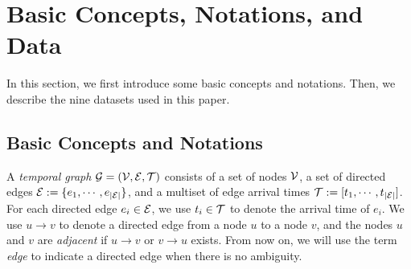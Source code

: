 \section{Basic Concepts, Notations, and Data}\label{section:prelim}

In this section, we first introduce some basic concepts and notations. Then, we describe the nine datasets used in this paper.







\subsection{Basic Concepts and Notations}
\label{sec:prelim:concept}

A \textit{temporal graph} $\mathcal{G} = (\mathcal{V}, \mathcal{E}, \mathcal{T})$ consists of a set of nodes $\mathcal{V}$, a set of directed edges $\mathcal{E}:=\{e_1,\cdots,e_{|\mathcal{E}|}\}$, and a multiset of edge arrival times $\mathcal{T}:=[t_1,\cdots, t_{|\mathcal{E}|}]$.
For each directed edge $e_i\in \mathcal{E}$,  we use $t_i \in \mathcal{T}$ to denote the arrival time of $e_i$.
We use $u \rightarrow v$ to denote a directed edge from a node $u$ to a node $v$, and the nodes $u$ and $v$ are \textit{adjacent} if $u \rightarrow v$ or $v \rightarrow u$ exists.
From now on, we will use the term \textit{edge} to indicate a directed edge when there is no ambiguity.

